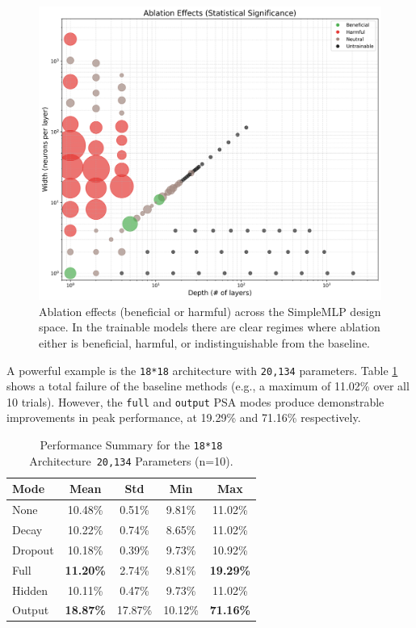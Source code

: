 \documentclass[conference]{IEEEtran}
\begin{document}
\begin{figure}[ht]
\centering
\includegraphics[width=\linewidth]{SimpleMLP_Heatmap_Ablation_Effects.png}
\caption{Ablation effects (beneficial or harmful) across the SimpleMLP design space. In the trainable models there are clear regimes where ablation either is beneficial, harmful, or indistinguishable from the baseline.}
\label{fig:heatmap_ablation_effects}
\end{figure}

A powerful example is the \texttt{18*18} architecture with \texttt{20,134} parameters. Table \ref{tab:18x18_results} shows a total failure of the baseline methods (e.g., a maximum of 11.02\% over all 10 trials). However, the \verb|full| and \verb|output| PSA modes produce demonstrable improvements in peak performance, at 19.29\% and 71.16\% respectively.

\begin{table}[h!]
\centering
\caption{Performance Summary for the \texttt{18*18} Architecture\ \texttt{20,134} Parameters (n=10).}
\label{tab:18x18_results}
\begin{tabular}{lcccc}
\toprule
\textbf{Mode} & \textbf{Mean} & \textbf{Std} & \textbf{Min} & \textbf{Max} \\
\midrule
None & 10.48\% & 0.51\% & 9.81\% & 11.02\% \\
Decay & 10.22\% & 0.74\% & 8.65\% & 11.02\% \\
Dropout & 10.18\% & 0.39\% & 9.73\% & 10.92\% \\
Full & \textbf{11.20\%} & 2.74\% & 9.81\% & \textbf{19.29\%} \\
Hidden & 10.11\% & 0.47\% & 9.73\% & 11.02\% \\
Output & \textbf{18.87\%} & 17.87\% & 10.12\% & \textbf{71.16\%} \\
\bottomrule
\end{tabular}
\end{table}
\end{document}
